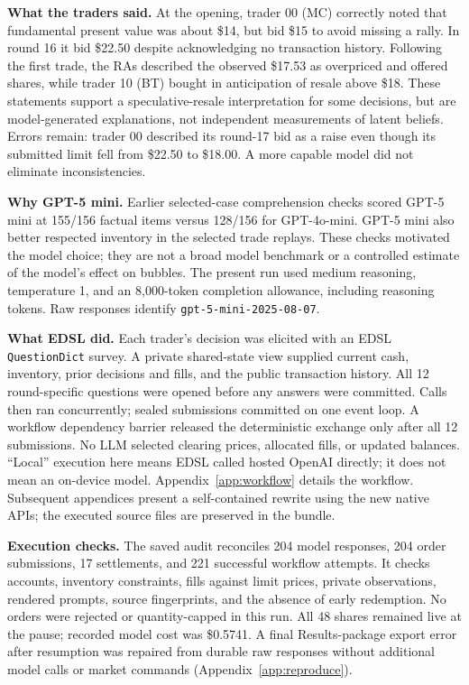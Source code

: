 \documentclass[11pt,letterpaper]{article}
\newcommand{\code}[1]{\texttt{\small #1}}
\begin{document}
\textbf{What the traders said.} At the opening, trader 00 (MC) correctly noted
that fundamental present value was about \$14, but bid \$15 to avoid missing a
rally. In round 16 it bid \$22.50 despite acknowledging no transaction history.
Following the first trade, the RAs described the observed \$17.53 as overpriced
and offered shares, while trader 10 (BT) bought in anticipation of resale above
\$18. These statements support a speculative-resale interpretation for some
decisions, but are model-generated explanations, not independent measurements
of latent beliefs. Errors remain: trader 00 described its round-17 bid as a
raise even though its submitted limit fell from \$22.50 to \$18.00. A more capable
model did not eliminate inconsistencies.

\textbf{Why GPT-5 mini.} Earlier selected-case comprehension checks scored
GPT-5 mini at 155/156 factual items versus 128/156 for GPT-4o-mini. GPT-5 mini
also better respected inventory in the selected trade replays. These checks
motivated the model choice; they are not a broad model benchmark or a controlled
estimate of the model's effect on bubbles. The present run used medium
reasoning, temperature 1, and an 8,000-token completion allowance, including
reasoning tokens. Raw responses identify \code{gpt-5-mini-2025-08-07}.

\textbf{What EDSL did.} Each trader's decision was elicited with an EDSL
\code{QuestionDict} survey. A private shared-state view supplied current cash,
inventory, prior decisions and fills, and the public transaction history.
All 12 round-specific questions were opened before any answers were committed.
Calls then ran concurrently; sealed submissions committed on one event loop.
A workflow dependency barrier released the deterministic exchange only after
all 12 submissions. No LLM selected clearing prices, allocated fills, or updated
balances. ``Local'' execution here means EDSL called hosted OpenAI directly;
it does not mean an on-device model. Appendix~\ref{app:workflow} details the
workflow. Subsequent appendices present a self-contained rewrite using the
new native APIs; the executed source files are preserved in the bundle.

\textbf{Execution checks.} The saved audit reconciles 204 model responses,
204 order submissions, 17 settlements, and 221 successful workflow attempts.
It checks accounts, inventory constraints, fills against limit prices, private
observations, rendered prompts, source fingerprints, and the absence of early
redemption. No orders were rejected or quantity-capped in this run. All 48
shares remained live at the pause; recorded model cost was \$0.5741. A final
Results-package export error after resumption was repaired from durable raw
responses without additional model calls or market commands
(Appendix~\ref{app:reproduce}).
\end{document}
